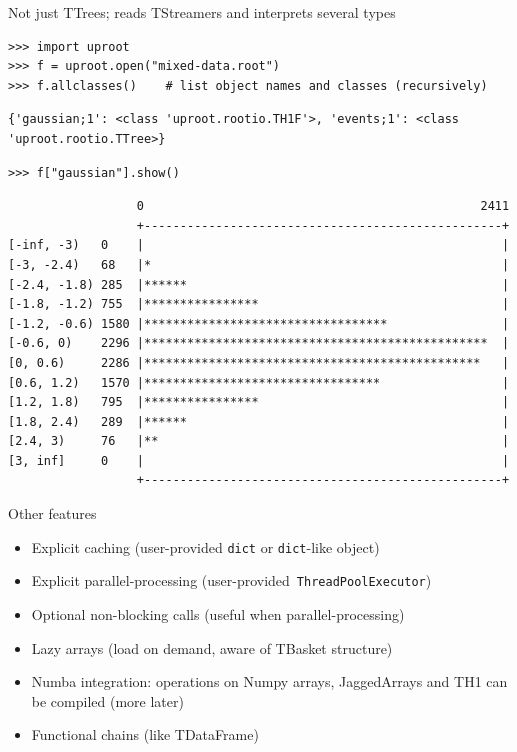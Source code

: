 \documentclass[aspectratio=169]{beamer}
\begin{document}
\begin{frame}[fragile]{Not just TTrees; reads TStreamers and interprets several types}
\vspace{0.1 cm}
\small
\begin{verbatim}
>>> import uproot
>>> f = uproot.open("mixed-data.root")
>>> f.allclasses()    # list object names and classes (recursively)
\end{verbatim}
\scriptsize
\begin{verbatim}
{'gaussian;1': <class 'uproot.rootio.TH1F'>, 'events;1': <class 'uproot.rootio.TTree>}
\end{verbatim}
\small
\begin{verbatim}
>>> f["gaussian"].show()
\end{verbatim}
\scriptsize
\begin{verbatim}
                  0                                               2411
                  +--------------------------------------------------+
[-inf, -3)   0    |                                                  |
[-3, -2.4)   68   |*                                                 |
[-2.4, -1.8) 285  |******                                            |
[-1.8, -1.2) 755  |****************                                  |
[-1.2, -0.6) 1580 |**********************************                |
[-0.6, 0)    2296 |************************************************  |
[0, 0.6)     2286 |***********************************************   |
[0.6, 1.2)   1570 |*********************************                 |
[1.2, 1.8)   795  |****************                                  |
[1.8, 2.4)   289  |******                                            |
[2.4, 3)     76   |**                                                |
[3, inf]     0    |                                                  |
                  +--------------------------------------------------+
\end{verbatim}
\end{frame}

\begin{frame}{Other features}
\vspace{0.5 cm}
\Large
\begin{itemize}\setlength{\itemsep}{0.4 cm}
\item Explicit caching (user-provided {\large\tt dict} or {\large\tt dict}-like object)
\item Explicit parallel-processing \mbox{(user-provided {\large\tt ThreadPoolExecutor})\hspace{-1 cm}}
\item Optional non-blocking calls (useful when parallel-processing)
\item Lazy arrays (load on demand, aware of TBasket structure)
\item Numba integration: operations on Numpy arrays, JaggedArrays and TH1 can be compiled (more later)
\item Functional chains (like TDataFrame)
\end{itemize}
\end{frame}
\end{document}
